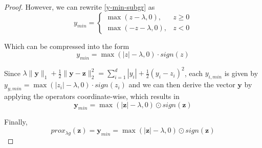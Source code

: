 \documentclass[12pt]{article}
\begin{document}
\begin{proof}
However, we can rewrite \eqref{y-min-subgr} as
\begin{equation} \label{y-min-penultimate}
     y_{min} = \begin{cases}
     \max (z - \lambda, 0),   & z \geq 0 \\
     \max (-z - \lambda, 0),   & z < 0
     \end{cases}
\end{equation}

Which can be compressed into the form
\begin{equation}
    y_{min} = \max(|z| - \lambda, 0) \cdot sign(z)
\end{equation}

Since $\lambda \lVert \mathbf{y} \rVert_1 + \frac{1}{2} \lVert \mathbf{y} - \mathbf{z} \rVert_2^2 = \sum_{i=1}^{d}|y_i| + \frac{1}{2}(y_i - z_i)^2$, each $y_{i, min}$ is given by $y_{y, min} = \max(|z_i| - \lambda, 0) \cdot sign(z_i)$ and we can then derive the vector $\mathbf{y}$ by applying the operators coordinate-wise, which results in
\begin{equation}
    \mathbf{y}_{min} = \max(|\mathbf{z}| - \lambda, 0) \odot sign(\mathbf{z})
\end{equation}

Finally,
\begin{equation}
    prox_{\lambda g}(\mathbf{z}) = \mathbf{y}_{min} = \max(|\mathbf{z}| - \lambda, 0) \odot sign(\mathbf{z})
\end{equation}

\end{proof}
\end{document}
